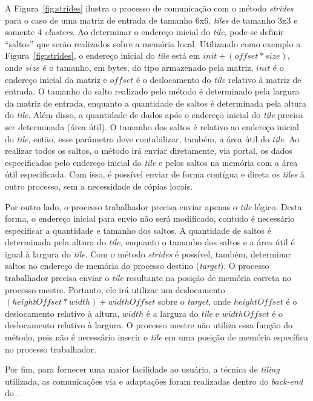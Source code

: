 
A Figura~\ref{fig:strides} ilustra o processo de comunicação com o método
\textit{strides} para o caso de uma matriz de entrada de tamanho 6x6, \textit{tiles} de tamanho 3x3
e somente 4 \textit{clusters}. Ao determinar o endereço inicial do
\textit{tile}, pode-se definir ``saltos'' que serão realizados sobre a
memória local. Utilizando como exemplo a Figura~\ref{fig:strides}, o endereço inicial
do \textit{tile} está em $init+(offset * size)$, onde $size$ é o tamanho, em bytes,
do tipo armazenado pela matriz, $init$ é o endereço inicial da matriz e $offset$
é o deslocamento do \textit{tile} relativo à matriz de entrada. O tamanho
do salto realizado pelo método é determinado pela largura da matriz de
entrada, enquanto a quantidade de saltos é determinada pela altura do
\textit{tile}. Além disso, a quantidade de dados após o endereço inicial do
\textit{tile} precisa ser determinada (área útil). O tamanho dos saltos é
relativo ao endereço inicial do \textit{tile}, então, esse parâmetro deve
contabilizar, também, a área útil do \textit{tile}. Ao realizar todos os
saltos, o método irá enviar diretamente, via portal, os dados especificados
pelo endereço inicial do \textit{tile} e pelos saltos na memória com a área útil
especificada. Com isso, é possível enviar de forma contígua e direta os
\textit{tiles} à outro processo, sem a necessidade de cópias locais.

Por outro lado, o processo trabalhador precisa enviar apenas o \textit{tile}
lógico. Desta forma, o endereço inicial para envio não será modificado, contudo
é necessário especificar a quantidade e tamanho dos saltos. A quantidade de
saltos é determinada pela altura do \textit{tile}, enquanto o tamanho dos
saltos e a área útil é igual à largura do \textit{tile}. Com o método
\textit{strides} é possível, também, determinar saltos no endereço de
memória do processo destino (\textit{target}). O processo trabalhador precisa
enviar o \textit{tile} resultante na posição de memória correta no processo
mestre.  Portanto, ele irá utilizar um deslocamento $(heightOffset * width) +
widthOffset$ sobre o \textit{target}, onde $heightOffset$ é o deslocamento
relativo à altura, $width$ é a largura do \textit{tile} e $widthOffset$ é o
deslocamento relativo à largura. O processo mestre não utiliza essa função do
método, pois não é necessário inserir o \textit{tile} em uma posição de memória
específica no processo trabalhador.

Por fim, para fornecer uma maior facilidade ao usuário, a técnica de
\textit{tiling} utilizada, as comunicações via \noc e adaptações foram
realizadas dentro do \textit{back-end} do \pskel.
